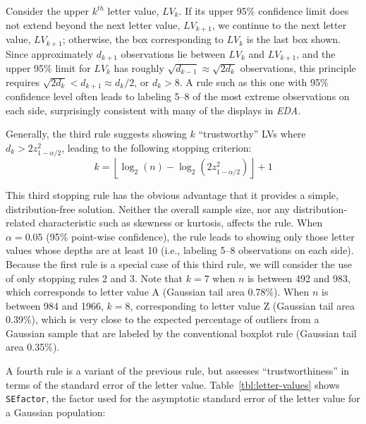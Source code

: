 \documentclass[oneside]{article}
\begin{document}
Consider the upper $k^{th}$ letter value, $LV_k$.  If its
upper 95\% confidence limit does not extend beyond the next letter value, $LV_{k+1}$,
we continue to the next letter value, $LV_{k+1}$; otherwise, the box corresponding to 
$LV_k$ is the last box shown.  
Since approximately $d_{k+1}$ observations lie 
between $LV_k$ and $LV_{k+1}$, 
and the upper 95\% limit for $LV_k$ has roughly 
$\sqrt{d_{k-1}} \approx \sqrt{2 d_k }$ 
observations, this principle requires
$\sqrt{2 d_k}  < d_{k+1} \approx d_k / 2$, or $d_k > 8$.
A rule such as this one with 95\% confidence level often leads to
labeling 5--8 
of the most extreme observations on each side,
surprisingly consistent with many of the displays in \textit{EDA}.

Generally, the third rule suggests showing $k$  ``trustworthy'' LVs where
$d_k >  2 z_{1-\alpha/2}^2 $, leading to the following stopping criterion:
\begin{equation}
k =  \left \lfloor \log_2 (n) - \log_2 
   \left(2  z_{1-\alpha/2}^2 \right) \right \rfloor + 1
\end{equation}


\noindent This third stopping rule has the obvious advantage that it provides a simple, distribution-free solution. Neither the overall sample size, nor any distribution-related characteristic such as skewness or kurtosis, affects the rule. When $\alpha = 0.05$ (95\% point-wise confidence), the rule leads to showing only those letter values whose depths are at least 10 (i.e., labeling 5--8 observations on each side). Because the first rule is a special case of this third rule, we will consider the use of only stopping rules 2 and 3. Note that $k = 7$ when $n$ is between 492 and 983, which corresponds to letter value A (Gaussian tail area 0.78\%). When $n$ is between 984 and 1966, $k = 8$, corresponding to letter value Z (Gaussian tail area 0.39\%), which is very close to the expected percentage of outliers from a Gaussian sample that are labeled by the conventional boxplot rule (Gaussian tail area 0.35\%).


A fourth rule is a variant of the previous rule, but assesses ``trustworthiness'' in terms of the standard error of the letter value. Table~\ref{tbl:letter-values} shows \texttt{SEfactor}, the factor used for the asymptotic standard error of the letter value for a Gaussian population:
\end{document}
